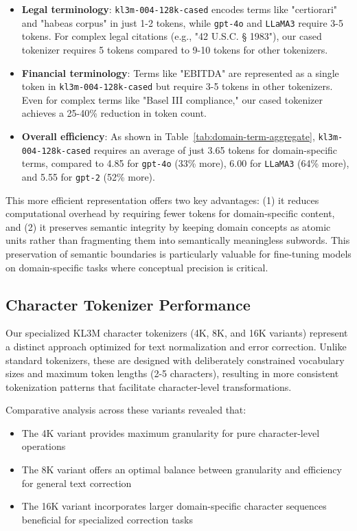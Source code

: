 \begin{itemize}
    \item \textbf{Legal terminology}: \texttt{kl3m-004-128k-cased} encodes terms like "certiorari" and "habeas corpus" in just 1-2 tokens, while \texttt{gpt-4o} and \texttt{LLaMA3} require 3-5 tokens. For complex legal citations (e.g., "42 U.S.C. § 1983"), our cased tokenizer requires 5 tokens compared to 9-10 tokens for other tokenizers.
    
    \item \textbf{Financial terminology}: Terms like "EBITDA" are represented as a single token in \texttt{kl3m-004-128k-cased} but require 3-5 tokens in other tokenizers. Even for complex terms like "Basel III compliance," our cased tokenizer achieves a 25-40\% reduction in token count.
    
    \item \textbf{Overall efficiency}: As shown in Table~\ref{tab:domain-term-aggregate}, \texttt{kl3m-004-128k-cased} requires an average of just 3.65 tokens for domain-specific terms, compared to 4.85 for \texttt{gpt-4o} (33\% more), 6.00 for \texttt{LLaMA3} (64\% more), and 5.55 for \texttt{gpt-2} (52\% more).
\end{itemize}

This more efficient representation offers two key advantages: (1) it reduces computational overhead by requiring fewer tokens for domain-specific content, and (2) it preserves semantic integrity by keeping domain concepts as atomic units rather than fragmenting them into semantically meaningless subwords. This preservation of semantic boundaries is particularly valuable for fine-tuning models on domain-specific tasks where conceptual precision is critical.

\subsection{Character Tokenizer Performance}

Our specialized KL3M character tokenizers (4K, 8K, and 16K variants) represent a distinct approach optimized for text normalization and error correction. Unlike standard tokenizers, these are designed with deliberately constrained vocabulary sizes and maximum token lengths (2-5 characters), resulting in more consistent tokenization patterns that facilitate character-level transformations.

Comparative analysis across these variants revealed that:
\begin{itemize}
    \item The 4K variant provides maximum granularity for pure character-level operations
    \item The 8K variant offers an optimal balance between granularity and efficiency for general text correction
    \item The 16K variant incorporates larger domain-specific character sequences beneficial for specialized correction tasks
\end{itemize}


